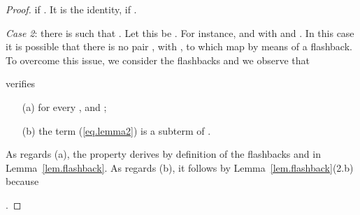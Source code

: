 \begin{proof}
 if . It is the identity,
if .

\emph{Case 2}: there is  such that . Let this  be . For instance, 
 and  with  and .
In this case it is possible that there is no pair , with , to which map 
 by means of a flashback.
To overcome 
this issue, we consider the flashbacks
 and we observe 
that

verifies
\begin{enumerate}
\item[(a)]
for every ,  and ;
\item[(b)]
the term (\ref{eq.lemma2}) is a subterm of .
\end{enumerate}
As regards (a), the property derives by definition of the flashbacks 
and  in Lemma~\ref{lem.flashback}.
As regards (b), it follows by Lemma~\ref{lem.flashback}(2.b) because 

 .
\end{proof}

